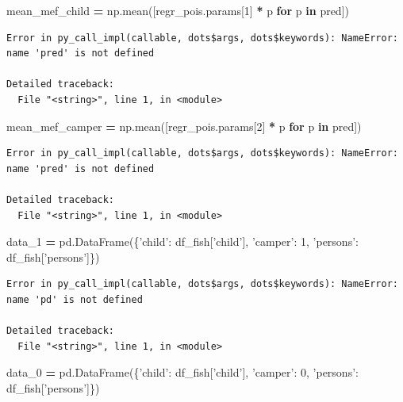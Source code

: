 \documentclass[]{book}
\newenvironment{Shaded}{\begin{snugshade}}{\end{snugshade}}
\newcommand{\ControlFlowTok}[1]{\textcolor[rgb]{0.13,0.29,0.53}{\textbf{#1}}}
\newcommand{\DecValTok}[1]{\textcolor[rgb]{0.00,0.00,0.81}{#1}}
\newcommand{\KeywordTok}[1]{\textcolor[rgb]{0.13,0.29,0.53}{\textbf{#1}}}
\newcommand{\NormalTok}[1]{#1}
\newcommand{\OperatorTok}[1]{\textcolor[rgb]{0.81,0.36,0.00}{\textbf{#1}}}
\newcommand{\StringTok}[1]{\textcolor[rgb]{0.31,0.60,0.02}{#1}}
\begin{document}
\begin{Shaded}
\begin{Highlighting}[]
\NormalTok{mean_mef_child }\OperatorTok{=}\NormalTok{ np.mean([regr_pois.params[}\DecValTok{1}\NormalTok{] }\OperatorTok{*}\NormalTok{ p }\ControlFlowTok{for}\NormalTok{ p }\KeywordTok{in}\NormalTok{ pred])}
\end{Highlighting}
\end{Shaded}

\begin{verbatim}
Error in py_call_impl(callable, dots$args, dots$keywords): NameError: name 'pred' is not defined

Detailed traceback: 
  File "<string>", line 1, in <module>
\end{verbatim}

\begin{Shaded}
\begin{Highlighting}[]
\NormalTok{mean_mef_camper }\OperatorTok{=}\NormalTok{ np.mean([regr_pois.params[}\DecValTok{2}\NormalTok{] }\OperatorTok{*}\NormalTok{ p }\ControlFlowTok{for}\NormalTok{ p }\KeywordTok{in}\NormalTok{ pred])}
\end{Highlighting}
\end{Shaded}

\begin{verbatim}
Error in py_call_impl(callable, dots$args, dots$keywords): NameError: name 'pred' is not defined

Detailed traceback: 
  File "<string>", line 1, in <module>
\end{verbatim}

\begin{Shaded}
\begin{Highlighting}[]
\NormalTok{data_1 }\OperatorTok{=}\NormalTok{ pd.DataFrame(\{}\StringTok{'child'}\NormalTok{: df_fish[}\StringTok{'child'}\NormalTok{], }\StringTok{'camper'}\NormalTok{: }\DecValTok{1}\NormalTok{, }\StringTok{'persons'}\NormalTok{: df_fish[}\StringTok{'persons'}\NormalTok{]\})}
\end{Highlighting}
\end{Shaded}

\begin{verbatim}
Error in py_call_impl(callable, dots$args, dots$keywords): NameError: name 'pd' is not defined

Detailed traceback: 
  File "<string>", line 1, in <module>
\end{verbatim}

\begin{Shaded}
\begin{Highlighting}[]
\NormalTok{data_0 }\OperatorTok{=}\NormalTok{ pd.DataFrame(\{}\StringTok{'child'}\NormalTok{: df_fish[}\StringTok{'child'}\NormalTok{], }\StringTok{'camper'}\NormalTok{: }\DecValTok{0}\NormalTok{, }\StringTok{'persons'}\NormalTok{: df_fish[}\StringTok{'persons'}\NormalTok{]\})}
\end{Highlighting}
\end{Shaded}
\end{document}

